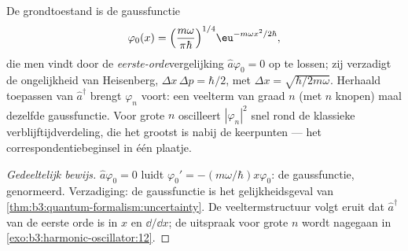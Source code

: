 \begin{proposition}\label{prop:b3:harmonic-oscillator:wavefunctions}
De grondtoestand is de gaussfunctie
\[
\varphi_0(x) = \Big(\frac{m\omega}{\pi\hbar}\Big)^{1/4}
\eu^{-m\omega x^2/2\hbar} ,
\]
die men vindt door de \emph{eerste-orde}vergelijking $\hat a\varphi_0
= 0$
op te lossen; zij verzadigt de ongelijkheid van Heisenberg, $\Delta x\,\Delta p =
\hbar/2$, met $\Delta x = \sqrt{\hbar/2m\omega}$. Herhaald
toepassen van $\hat a^\dagger$ brengt $\varphi_n$ voort: een veelterm van
graad $n$ (met $n$ knopen) maal dezelfde gaussfunctie. Voor grote $n$
oscilleert $|\varphi_n|^2$ snel rond de klassieke verblijftijdverdeling,
die het grootst is nabij de keerpunten --- het correspondentiebeginsel in
één plaatje.
\end{proposition}

\begin{proof}[Gedeeltelijk bewijs]
$\hat a\varphi_0 = 0$ luidt $\varphi_0' = -(m\omega/\hbar)x
\varphi_0$: de gaussfunctie, genormeerd. Verzadiging: de gaussfunctie is
het gelijkheidsgeval van \cref{thm:b3:quantum-formalism:uncertainty}. De
veeltermstructuur volgt eruit dat $\hat a^\dagger$ van de eerste orde is
in $x$ en $\dd/\dd x$; de uitspraak voor grote $n$ wordt nagegaan in
\cref{exo:b3:harmonic-oscillator:12}.
\end{proof}

